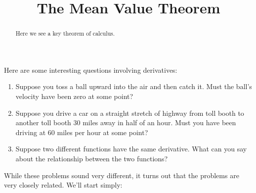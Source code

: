 \documentclass{ximera}
\title[Dig-In:]{The Mean Value Theorem}
\begin{document}
\begin{abstract}
  Here we see a key theorem of calculus.
\end{abstract}
\maketitle


Here are some interesting questions involving derivatives:

\begin{enumerate}
	\item Suppose you toss a ball upward into the air and then catch it. Must the
		ball's  velocity have been zero at some point?
	\item Suppose you drive a car on a straight stretch of highway from toll booth to
		another toll booth $30$ miles away in half of an hour. Must you have
		been driving at $60$ miles per hour at some point?
	\item Suppose two different functions have the same derivative. What
		can you say about the relationship between the two functions?
\end{enumerate}

While these problems sound very different, it turns out that the problems are very closely related. We'll start simply:
\end{document}

